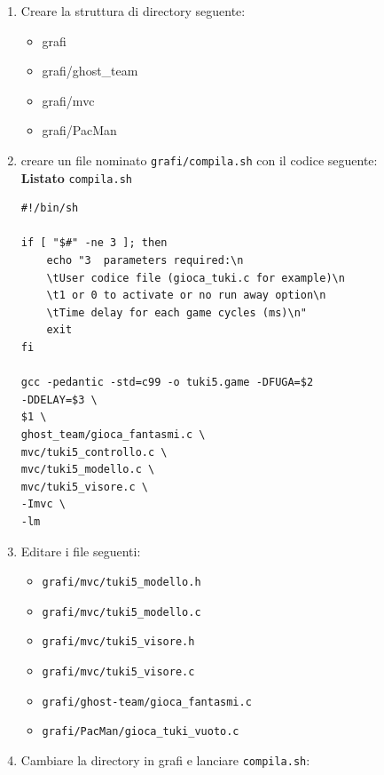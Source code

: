 \documentclass[8pt]{book}
\begin{document}
\begin{enumerate}
\item
  Creare la struttura di directory seguente:

  \begin{itemize}
  \item
    grafi
  \item
    grafi/ghost\_team
  \item
    grafi/mvc
  \item
    grafi/PacMan
  \end{itemize}
\item
  creare un file nominato \texttt{grafi/compila.sh} con il codice seguente:\\

  \textbf{Listato} \texttt{compila.sh}

  
  \begin{spacing}{0.9}
    \begin{small}
        \begin{tcolorbox}
\begin{verbatim}
#!/bin/sh

if [ "$#" -ne 3 ]; then
    echo "3  parameters required:\n
    \tUser codice file (gioca_tuki.c for example)\n
    \t1 or 0 to activate or no run away option\n
    \tTime delay for each game cycles (ms)\n"
    exit
fi

gcc -pedantic -std=c99 -o tuki5.game -DFUGA=$2 
-DDELAY=$3 \
$1 \
ghost_team/gioca_fantasmi.c \
mvc/tuki5_controllo.c \
mvc/tuki5_modello.c \
mvc/tuki5_visore.c \
-Imvc \
-lm
\end{verbatim}
\end{tcolorbox}
      \end{small}
    \end{spacing}

  
\item
  Editare i file seguenti:

  \begin{itemize}
  \item
    \texttt{grafi/mvc/tuki5\_modello.h}
  \item
    \texttt{grafi/mvc/tuki5\_modello.c}
  \item
    \texttt{grafi/mvc/tuki5\_visore.h}
  \item
    \texttt{grafi/mvc/tuki5\_visore.c}
  \item
    \texttt{grafi/ghost-team/gioca\_fantasmi.c}
  \item
    \texttt{grafi/PacMan/gioca\_tuki\_vuoto.c}
  \end{itemize}
\item
  Cambiare la directory in grafi e lanciare \texttt{compila.sh}:


\end{enumerate}
\end{document}
